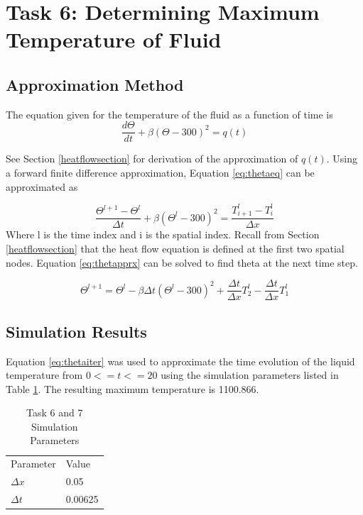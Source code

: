 \documentclass[12pt]{amsart}
\begin{document}
\section{Task 6: Determining Maximum Temperature of Fluid} \label{fluidtempsection}
\subsection{Approximation Method}
The equation given for the temperature of the fluid as a function of time is
\begin{equation}
\frac{d \Theta}{dt}+ \beta (\Theta - 300)^2 = q(t)
\label{eq:thetaeq}
\end{equation}

See Section \ref{heatflowsection} for derivation of the approximation of $q(t)$. Using a forward finite difference approximation, Equation \ref{eq:thetaeq} can be approximated as

\begin{equation}
\frac{\Theta^{l+1} - \Theta^{l}}{\Delta t} + \beta (\Theta^l - 300)^2 = \frac{T^l_{i+1} - T^{l}_i}{\Delta x}
\label{eq:thetapprx}
\end{equation}
Where l is the time index and i is the spatial index. Recall from Section \ref{heatflowsection} that the heat flow equation is defined at the first two spatial nodes. Equation \ref{eq:thetapprx} can be solved to find theta at the next time step.

\begin{equation}
\Theta ^{l+1} = \Theta ^l - \beta \Delta t (\Theta ^l - 300)^2 + \frac{\Delta t}{\Delta x} T^l_2 - \frac{\Delta t}{\Delta x} T^l_1
\label{eq:thetaiter}
\end{equation}

\subsection{Simulation Results}
Equation \ref{eq:thetaiter} was used to approximate the time evolution of the liquid temperature from $0<=t<=20$ using the simulation parameters listed in Table \ref{task6param}. The resulting maximum temperature is 1100.866. 
\begin{table}[]
\centering
\caption{Task 6 and 7 Simulation Parameters}
\label{task6param}
\begin{tabular}{ll}
Parameter            & Value \\
$\Delta x$           & 0.05  \\
$\Delta t$           & 0.00625 
\end{tabular}
\end{table}
\end{document}
